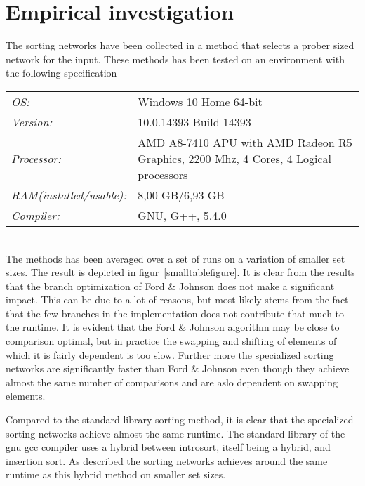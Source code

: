 \section{Empirical investigation}
The sorting networks have been collected in a method that selects a prober sized network for the input. These methods has been tested on an environment with the following specification\\

\begin{tabular}{l p{6cm}}
	\textit{OS:} & Windows 10 Home 64-bit\\
	\textit{Version:} & 10.0.14393 Build 14393\\
	\textit{Processor:} & AMD A8-7410 APU with AMD Radeon R5 Graphics, 2200 Mhz, 4 Cores, 4 Logical processors\\
	\textit{RAM(installed/usable):} & 8,00 GB/6,93 GB\\
	\textit{Compiler:} & GNU, G++, 5.4.0
\end{tabular}\\

The methods has been averaged over a set of runs on a variation of smaller set sizes. The result is depicted in figur~\ref{smalltablefigure}. It is clear from the results that the branch optimization of Ford \& Johnson does not make a significant impact. This can be due to a lot of reasons, but most likely stems from the fact that the few branches in the implementation does not contribute that much to the runtime. It is evident that the Ford \& Johnson algorithm may be close to comparison optimal, but in practice the swapping and shifting of elements of which it is fairly dependent is too slow. Further more the specialized sorting networks are significantly faster than Ford \& Johnson even though they achieve almost the same number of comparisons and are aslo dependent on swapping elements.

Compared to the standard library sorting method, it is clear that the specialized sorting networks achieve almost the same runtime. The standard library of the gnu gcc compiler uses a hybrid between introsort, itself being a hybrid, and insertion sort\cite{gnustd}. As described the sorting networks achieves around the same runtime as this hybrid method on smaller set sizes.

